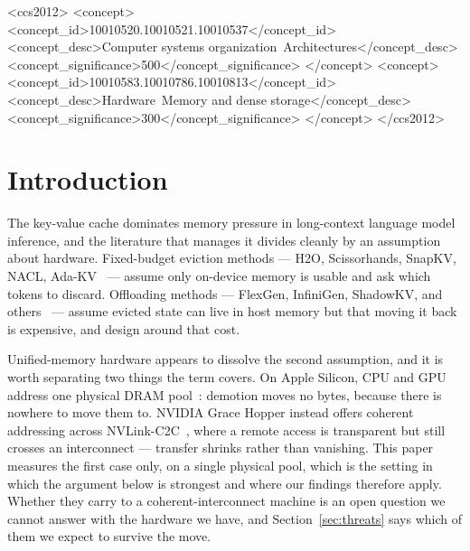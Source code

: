 \documentclass[manuscript,anonymous,review]{acmart}
\begin{document}
\begin{CCSXML}
<ccs2012>
   <concept>
       <concept_id>10010520.10010521.10010537</concept_id>
       <concept_desc>Computer systems organization~Architectures</concept_desc>
       <concept_significance>500</concept_significance>
   </concept>
   <concept>
       <concept_id>10010583.10010786.10010813</concept_id>
       <concept_desc>Hardware~Memory and dense storage</concept_desc>
       <concept_significance>300</concept_significance>
   </concept>
</ccs2012>
\end{CCSXML}



\maketitle

\section{Introduction}
\label{sec:intro}

The key-value cache dominates memory pressure in long-context language
model inference, and the literature that manages it divides cleanly by
an assumption about hardware. Fixed-budget eviction methods --- H2O,
Scissorhands, SnapKV, NACL, Ada-KV~\cite{zhang2023h2o,liu2023scissorhands,li2024snapkv,chen2024nacl,feng2025adakv}
--- assume only on-device memory is usable and ask which tokens to
discard. Offloading methods --- FlexGen, InfiniGen, ShadowKV, and
others~\cite{sheng2023flexgen,lee2024infinigen,sun2025shadowkv,cheng2025lmcache}
--- assume evicted state can live in host memory but that moving it
back is expensive, and design around that cost.

Unified-memory hardware appears to dissolve the second assumption, and
it is worth separating two things the term covers. On Apple Silicon,
CPU and GPU address one physical DRAM pool~\cite{apple2024m4pro,mlx2024}:
demotion moves no bytes, because there is nowhere to move them to.
NVIDIA Grace Hopper instead offers coherent addressing across
NVLink-C2C~\cite{nvidia2024gh200}, where a remote access is
transparent but still crosses an interconnect --- transfer shrinks
rather than vanishing. This paper measures the first case only, on a
single physical pool, which is the setting in which the argument below
is strongest and where our findings therefore apply. Whether they
carry to a coherent-interconnect machine is an open question we cannot
answer with the hardware we have, and Section~\ref{sec:threats} says
which of them we expect to survive the move.
\end{document}
